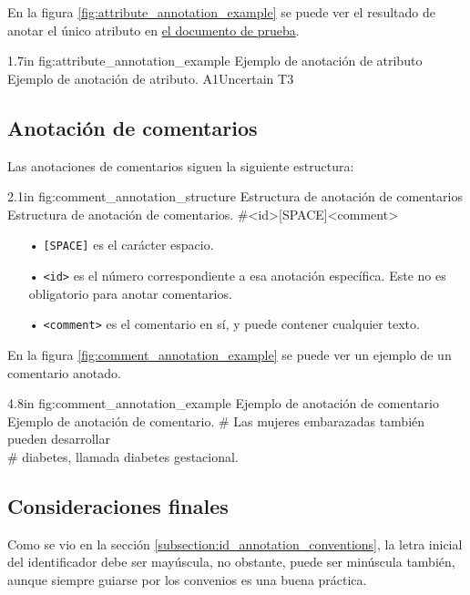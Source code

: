 En la figura \ref{fig:attribute_annotation_example} se puede ver el resultado de anotar el único atributo en \hyperref[sentence:annotation_example]{el documento de prueba}.

\begin{annexample}
	[backgroundcolor=cyan!13]
	{1.7in}
	{fig:attribute_annotation_example}
	{Ejemplo de anotación de atributo}
	{Ejemplo de anotación de atributo.}
	A1\space\space Uncertain T3
\end{annexample}

\subsection{Anotación de comentarios}
Las anotaciones de comentarios siguen la siguiente estructura:

\begin{annexample}
	[backgroundcolor=green!13]
	{2.1in}
	{fig:comment_annotation_structure}
	{Estructura de anotación de comentarios}
	{Estructura de anotación de comentarios.}
	\#<id>[SPACE]<comment>
\end{annexample}

\begin{itemize}
	\item[•] \texttt{[SPACE]} es el carácter espacio.
	\vspace{-0.1in}
	\item[•] \texttt{<id>} es el número correspondiente a esa anotación específica. Este no es obligatorio para anotar comentarios.
	\vspace{-0.1in}
	\item[•] \texttt{<comment>} es el comentario en sí, y puede contener cualquier texto.
\end{itemize}

En la figura \ref{fig:comment_annotation_example} se puede ver un ejemplo de un comentario anotado.

\begin{annexample}
	[backgroundcolor=cyan!13]
	{4.8in}
	{fig:comment_annotation_example}
	{Ejemplo de anotación de comentario}
	{Ejemplo de anotación de comentario.}
	\# Las mujeres embarazadas también pueden desarrollar\\
	\# diabetes, llamada diabetes gestacional.
\end{annexample}

\subsection{Consideraciones finales}
Como se vio en la sección \ref{subsection:id_annotation_conventions}, la letra inicial del identificador debe ser mayúscula, no obstante, puede ser minúscula también, aunque siempre guiarse por los convenios es una buena práctica.

